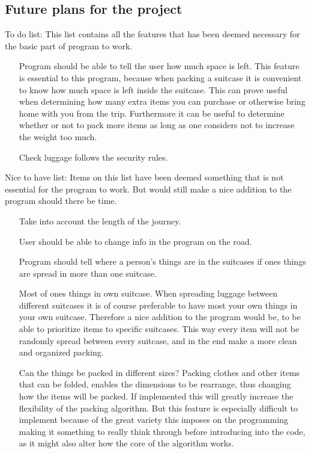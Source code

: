 \subsection{Future plans for the project}


To do list:
This list contains all the features that has been deemed necessary for the basic part of program to work.
\begin{itemize}
\item[Program should be able to tell the user how much space is left.]
This feature is essential to this program, because when packing a suitcase it is convenient to know how much space is left inside the suitcase. This can prove useful when determining how many extra items you can purchase or otherwise bring home with you from the trip. Furthermore it can be useful to determine whether or not to pack more items as long as one considers not to increase the weight too much.
\item[Check luggage follows the security rules.]
\end{itemize}

Nice to have list:
Items on this list have been deemed something that is not essential for the program to work. But would still make a nice addition to the program should there be time.
\begin{itemize}
\item[Take into account the length of the journey.]
\item[User should be able to change info in the program on the road.]
\item[Program should tell where a person's things are in the suitcases if ones things are spread in more than one suitcase.]
\item[Most of ones things in own suitcase.]
When spreading luggage between different suitcases it is of course preferable to have most your own things in your own suitcase. Therefore a nice addition to the program would be, to be able to prioritize items to specific suitcases. This way every item will not be randomly spread between every suitcase, and in the end make a more clean and organized packing.
\item[Can the things be packed in different sizes?]
Packing clothes and other items that can be folded, enables the dimensions to be rearrange, thus changing how the items will be packed. If implemented this will greatly increase the flexibility of the packing algorithm. But this feature is especially difficult to implement because of the great variety this imposes on the programming making it something to really think through before introducing into the code, as it might also alter how the core of the algorithm works.
\end{itemize}